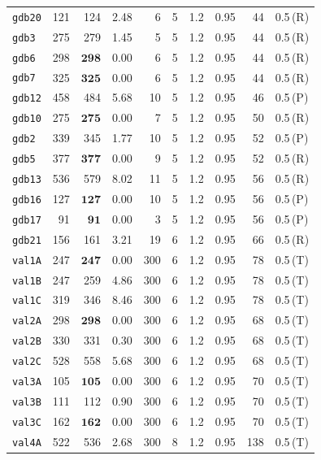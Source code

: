 \begin{longtable}{lrrrrrrrrl}
\texttt{gdb20} & 121 & 124 & 2.48 & 6 & 5 & 1.2 & 0.95 & 44 & 0.5\,(R) \\
\texttt{gdb3} & 275 & 279 & 1.45 & 5 & 5 & 1.2 & 0.95 & 44 & 0.5\,(R) \\
\texttt{gdb6} & 298 & $\mathbf{298}$ & 0.00 & 6 & 5 & 1.2 & 0.95 & 44 & 0.5\,(R) \\
\texttt{gdb7} & 325 & $\mathbf{325}$ & 0.00 & 6 & 5 & 1.2 & 0.95 & 44 & 0.5\,(R) \\
\texttt{gdb12} & 458 & 484 & 5.68 & 10 & 5 & 1.2 & 0.95 & 46 & 0.5\,(P) \\
\texttt{gdb10} & 275 & $\mathbf{275}$ & 0.00 & 7 & 5 & 1.2 & 0.95 & 50 & 0.5\,(R) \\
\texttt{gdb2} & 339 & 345 & 1.77 & 10 & 5 & 1.2 & 0.95 & 52 & 0.5\,(P) \\
\texttt{gdb5} & 377 & $\mathbf{377}$ & 0.00 & 9 & 5 & 1.2 & 0.95 & 52 & 0.5\,(R) \\
\texttt{gdb13} & 536 & 579 & 8.02 & 11 & 5 & 1.2 & 0.95 & 56 & 0.5\,(R) \\
\texttt{gdb16} & 127 & $\mathbf{127}$ & 0.00 & 10 & 5 & 1.2 & 0.95 & 56 & 0.5\,(P) \\
\texttt{gdb17} & 91 & $\mathbf{91}$ & 0.00 & 3 & 5 & 1.2 & 0.95 & 56 & 0.5\,(P) \\
\texttt{gdb21} & 156 & 161 & 3.21 & 19 & 6 & 1.2 & 0.95 & 66 & 0.5\,(R) \\
\texttt{val1A} & 247 & $\mathbf{247}$ & 0.00 & 300 & 6 & 1.2 & 0.95 & 78 & 0.5\,(T) \\
\texttt{val1B} & 247 & 259 & 4.86 & 300 & 6 & 1.2 & 0.95 & 78 & 0.5\,(T) \\
\texttt{val1C} & 319 & 346 & 8.46 & 300 & 6 & 1.2 & 0.95 & 78 & 0.5\,(T) \\
\texttt{val2A} & 298 & $\mathbf{298}$ & 0.00 & 300 & 6 & 1.2 & 0.95 & 68 & 0.5\,(T) \\
\texttt{val2B} & 330 & 331 & 0.30 & 300 & 6 & 1.2 & 0.95 & 68 & 0.5\,(T) \\
\texttt{val2C} & 528 & 558 & 5.68 & 300 & 6 & 1.2 & 0.95 & 68 & 0.5\,(T) \\
\texttt{val3A} & 105 & $\mathbf{105}$ & 0.00 & 300 & 6 & 1.2 & 0.95 & 70 & 0.5\,(T) \\
\texttt{val3B} & 111 & 112 & 0.90 & 300 & 6 & 1.2 & 0.95 & 70 & 0.5\,(T) \\
\texttt{val3C} & 162 & $\mathbf{162}$ & 0.00 & 300 & 6 & 1.2 & 0.95 & 70 & 0.5\,(T) \\
\texttt{val4A} & 522 & 536 & 2.68 & 300 & 8 & 1.2 & 0.95 & 138 & 0.5\,(T) \\

\end{longtable}
